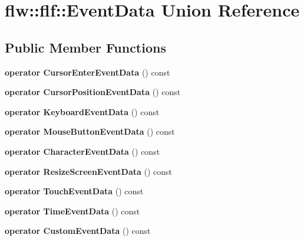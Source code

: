 \hypertarget{unionflw_1_1flf_1_1EventData}{}\section{flw\+:\+:flf\+:\+:Event\+Data Union Reference}
\label{unionflw_1_1flf_1_1EventData}
\subsection*{Public Member Functions}
\begin{DoxyCompactItemize}
\item 
\mbox{\label{unionflw_1_1flf_1_1EventData_a26903aeaaf919d42dd3a41c737e7971a}} 
{\bfseries operator Cursor\+Enter\+Event\+Data} () const
\item 
\mbox{\label{unionflw_1_1flf_1_1EventData_a45eb0d94d8ef1dcb68fcf530f95499e4}} 
{\bfseries operator Cursor\+Position\+Event\+Data} () const
\item 
\mbox{\label{unionflw_1_1flf_1_1EventData_a33b67e9ad79007132b14f326b82ceb07}} 
{\bfseries operator Keyboard\+Event\+Data} () const
\item 
\mbox{\label{unionflw_1_1flf_1_1EventData_a5fec41de17c6564a1e34614793ec1015}} 
{\bfseries operator Mouse\+Button\+Event\+Data} () const
\item 
\mbox{\label{unionflw_1_1flf_1_1EventData_ab79fbfb42ead5d697f50842068f04c12}} 
{\bfseries operator Character\+Event\+Data} () const
\item 
\mbox{\label{unionflw_1_1flf_1_1EventData_ad78864374478325b9a2e1d74acd8acdc}} 
{\bfseries operator Resize\+Screen\+Event\+Data} () const
\item 
\mbox{\label{unionflw_1_1flf_1_1EventData_aa2043636a4a5be3fd109f69c72477b20}} 
{\bfseries operator Touch\+Event\+Data} () const
\item 
\mbox{\label{unionflw_1_1flf_1_1EventData_acdcdaa201defd9c765ff9470753ecbf7}} 
{\bfseries operator Time\+Event\+Data} () const
\item 
\mbox{\label{unionflw_1_1flf_1_1EventData_a066501491860a47ba780f82e7e054fb7}} 
{\bfseries operator Custom\+Event\+Data} () const
\end{DoxyCompactItemize}
